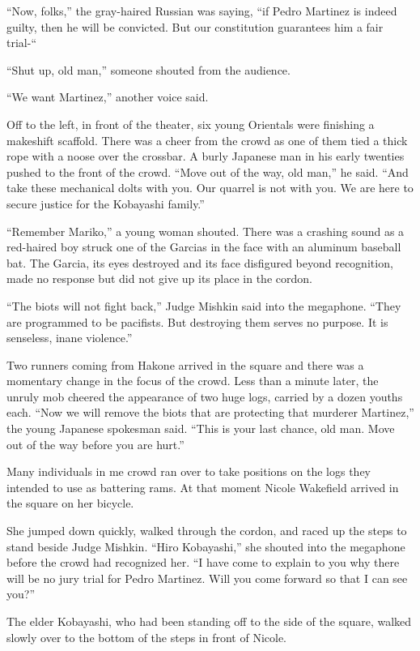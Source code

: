 \documentclass[]{article}
\begin{document}
{“Now, folks,” the gray-haired Russian was saying, “if Pedro Martinez is indeed guilty, then he will be convicted.  But our constitution guarantees him a fair trial-“

“Shut up, old man,” someone shouted from the audience.

“We want Martinez,” another voice said.

Off to the left, in front of the theater, six young Orientals were finishing a makeshift scaffold.  There was a cheer from the crowd as one of them tied a thick rope with a noose over the crossbar.  A burly Japanese man in his early twenties pushed to the front of the crowd.  “Move out of the way, old man,” he said.  “And take these mechanical dolts with you.  Our quarrel is not with you.  We are here to secure justice for the Kobayashi family.”

“Remember Mariko,” a young woman shouted.  There was a crashing sound as a red-haired boy struck one of the Garcias in the face with an aluminum baseball bat.  The Garcia, its eyes destroyed and its face disfigured beyond recognition, made no response but did not give up its place in the cordon.

“The biots will not fight back,” Judge Mishkin said into the megaphone.  “They are programmed to be pacifists.  But destroying them serves no purpose.  It is senseless, inane violence.”

Two runners coming from Hakone arrived in the square and there was a momentary change in the focus of the crowd.  Less than a minute later, the unruly mob cheered the appearance of two huge logs, carried by a dozen youths each.  “Now we will remove the biots that are protecting that murderer Martinez,” the young Japanese spokesman said.  “This is your last chance, old man.  Move out of the way before you are hurt.”

Many individuals in me crowd ran over to take positions on the logs they intended to use as battering rams.  At that moment Nicole Wakefield arrived in the square on her bicycle.

She jumped down quickly, walked through the cordon, and raced up the steps to stand beside Judge Mishkin.  “Hiro Kobayashi,” she shouted into the megaphone before the crowd had recognized her.  “I have come to explain to you why there will be no jury trial for Pedro Martinez.  Will you come forward so that I can see you?”

The elder Kobayashi, who had been standing off to the side of the square, walked slowly over to the bottom of the steps in front of Nicole.

}
\end{document}
